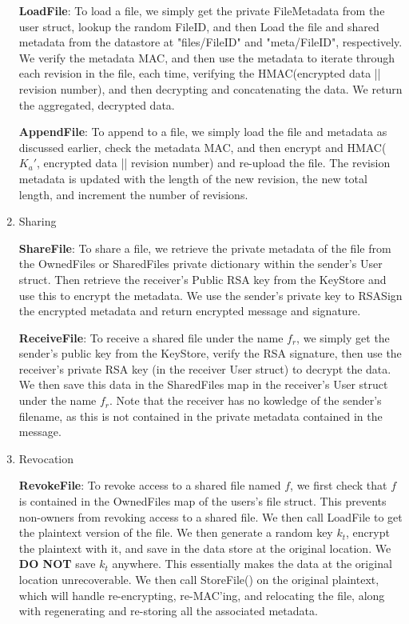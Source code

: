 \documentclass[11pt]{article}
\begin{document}
\begin{enumerate}
\textbf{LoadFile}: To load a file, we simply get the private FileMetadata from the user struct, lookup the random FileID, and then Load the file and shared metadata from the datastore at "files/FileID" and "meta/FileID", respectively. We verify the metadata MAC, and then use the metadata to iterate through each revision in the file, each time, verifying the HMAC(encrypted data || revision number), and then decrypting and concatenating the data. We return the aggregated, decrypted data.

\textbf{AppendFile}: To append to a file, we simply load the file and metadata as discussed earlier, check the metadata MAC, and then encrypt and HMAC($K_a'$, encrypted data || revision number) and re-upload the file. The revision metadata is updated with the length of the new revision, the new total length, and increment the number of revisions.

\item{Sharing}

\textbf{ShareFile}: To share a file, we retrieve the private metadata of the file from the OwnedFiles or SharedFiles private dictionary within the sender's User struct. Then retrieve the receiver's Public RSA key from the KeyStore and use this to encrypt the metadata. We use the sender's private key to RSASign the encrypted metadata and return encrypted message and signature.

\textbf{ReceiveFile}: To receive a shared file under the name $f_r$, we simply get the sender's public key from the KeyStore, verify the RSA signature, then use the receiver's private RSA key (in the receiver User struct) to decrypt the data. We then save this data in the SharedFiles map in the receiver's User struct under the name $f_r$. Note that the receiver has no kowledge of the sender's filename, as this is not contained in the private metadata contained in the message.

\item{Revocation}

\textbf{RevokeFile}: To revoke access to a shared file named $f$, we first check that $f$ is contained in the OwnedFiles map of the users's file struct. This prevents non-owners from revoking access to a shared file. We then call LoadFile to get the plaintext version of the file. We then generate a random key $k_t$, encrypt the plaintext with it, and save in the data store at the original location. We \textbf{DO NOT} save $k_t$ anywhere. This essentially makes the data at the original location unrecoverable. We then call StoreFile() on the original plaintext, which will handle re-encrypting, re-MAC'ing, and relocating the file, along with regenerating and re-storing all the associated metadata.

\end{enumerate}
\end{document}
